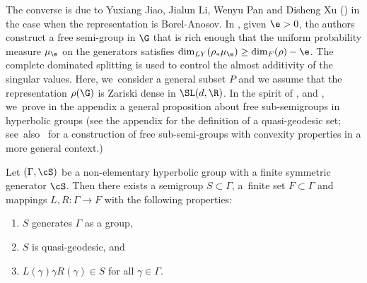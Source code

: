 The converse is due to Yuxiang Jiao, Jialun Li, Wenyu Pan and Disheng Xu (\cite{JLPX23}) in the case when the representation is Borel-Anosov. In \cite{JLPX23}, given \(\e>0\), the authors construct a free semi-group in \(\G\) that is rich enough that the uniform probability measure \(\mu_\e \) on the generators satisfies \(\dim_{LY}(\rho_*\mu_\e) \ge \dim_F(\rho) -\e\). The complete dominated splitting is used to control the almost additivity of the singular values.
Here, we~consider a general subset \(P\) and we assume that the representation \(\rho(\G)\) is Zariski dense in \(\SL(d,\R)\). In the spirit of \cite{gouezel}, \cite{random} and \cite{JLPX23}, we~prove in the appendix a general proposition about free sub-semigroups in hyperbolic groups (see the appendix for the definition of a quasi-geodesic set; see~also~\cite{yang} for a construction of free sub-semi-groups with convexity properties in a more general context.)
\begin{proposition}[$={}$Proposition \ref{semigrouplemma}]
Let \((\Gamma,\cS)\) be a non-elementary hyperbolic group with a finite symmetric generator \(\cS\). Then there exists a semigroup \(S \subset \Gamma\), a~finite set \(F \subset \Gamma\) and mappings \(L,R:\Gamma \to F\) with the following properties:
\begin{enumerate}
\item \(S\) generates \(\Gamma\) as a group,
\item \(S\) is quasi-geodesic, and
\item \(L(\gamma)\gamma R(\gamma) \in S\) for all \(\gamma \in \Gamma\).
\end{enumerate}
\end{proposition}
